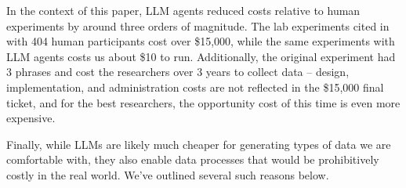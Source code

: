\documentclass{article} %
\begin{document}
In the context of this paper, LLM agents reduced costs relative to human experiments by around three orders of magnitude. 
The lab experiments cited in \cite{li2017obviously} with 404 human participants cost over \$15,000, while the same experiments with LLM agents costs us about \$10 to run. 
Additionally, the original experiment had 3 phrases and cost the researchers over 3 years to collect data -- design, implementation, and administration costs are not reflected in the \$15,000 final ticket, and for the best researchers, the opportunity cost of this time is even more expensive.

Finally, while LLMs are likely much cheaper for generating types of data we are comfortable with, they also enable data processes that would be prohibitively costly in the real world. 
We've outlined several such reasons below.
\end{document}
